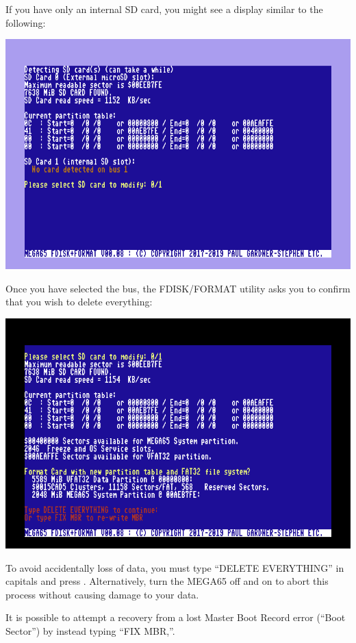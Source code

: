 If you have only an internal SD card, you might see a display similar to the following:

\includegraphics[width=\linewidth]{images/ss-m65fdisk-busselect.png}

Once you have selected the bus, the FDISK/FORMAT utility asks you to confirm that you wish to delete everything:

\includegraphics[width=\linewidth]{images/ss-m65fdisk-typesomething.png}

To avoid accidentally loss of data, you must type ``DELETE EVERYTHING'' in capitals and press .  Alternatively, turn the MEGA65 off and on to abort this process without causing damage to your data.

It is possible to attempt a recovery from a lost Master Boot Record error (``Boot Sector'') by instead typing ``FIX MBR,''.

